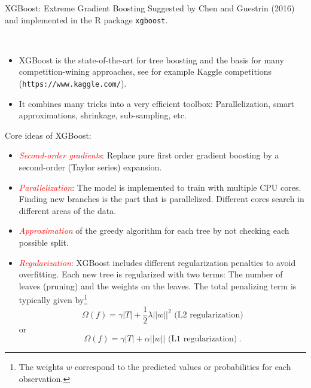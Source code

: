 \documentclass[
  10pt,
  ignorenonframetext,
]{beamer}
\providecommand{\tightlist}{%
  \setlength{\itemsep}{0pt}\setlength{\parskip}{0pt}}
\begin{document}
\begin{frame}[fragile]{XGBoost: Extreme Gradient Boosting}
\label{xgboost-extreme-gradient-boosting}
Suggested by Chen and Guestrin (2016) and implemented in the R package
\texttt{xgboost}.

\(~\)

\begin{itemize}
\tightlist
\item
  XGBoost is the state-of-the-art for tree boosting and the basis for
  many competition-wining approaches, see for example Kaggle
  competitions (\texttt{https://www.kaggle.com/}).
\end{itemize}

\vspace{2mm}

\begin{itemize}
\tightlist
\item
  It combines many tricks into a very efficient toolbox:
  Parallelization, smart approximations, shrinkage, sub-sampling, etc.
\end{itemize}
\end{frame}

\begin{frame}
Core ideas of XGBoost:

\begin{itemize}
\item
  \emph{\textcolor{red}{Second-order gradients}}: Replace pure first
  order gradient boosting by a second-order (Taylor series) expansion.
\item
  \emph{\textcolor{red}{Parallelization}}: The model is implemented to
  train with multiple CPU cores. Finding new branches is the part that
  is parallelized. Different cores search in different areas of the
  data.
\item
  \emph{\textcolor{red}{Approximation}} of the greedy algorithm for each
  tree by not checking each possible split.
\item
  \emph{\textcolor{red}{Regularization}}: XGBoost includes different
  regularization penalties to avoid overfitting. Each new tree is
  regularized with two terms: The number of leaves (pruning) and the
  weights on the leaves. The total penalizing term is typically given
  by\footnote{The weights $w$ correspond to the predicted values or probabilities for each observation.}
  \[\Omega(f) = \gamma |T| + \frac{1}{2}\lambda||w||^2  \text{ (L2 regularization)} \]
  or
  \[\Omega(f) = \gamma |T| +  \alpha ||w|| \text{ (L1 regularization)}  \ .  \]
\end{itemize}
\end{frame}
\end{document}
